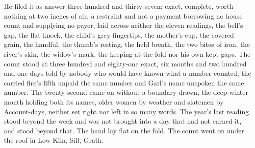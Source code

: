 He filed it as answer three hundred and thirty-seven: exact, complete, worth nothing at two inches of air, a restraint and not a payment borrowing no house count and supplying no payer, laid across neither the eleven readings, the bell's gap, the flat knock, the child's grey fingertips, the mother's cup, the covered grain, the handful, the thumb's resting, the held breath, the two bites of iron, the river's skin, the widow's mark, the keeping at the fold nor his own kept gaps. The count stood at three hundred and eighty-one exact, six months and two hundred and one days told by nobody who would have known what a number counted, the carried fire's fifth unpaid the same number and Garl's name unspoken the same number. The twenty-second came on without a boundary drawn, the deep-winter month holding both its names, older women by weather and slatemen by Account-days, neither set right nor left in so many words. The year's last reading stood beyond the week and was not brought into a day that had not earned it, and  stood beyond that. The hand lay flat on the fold. The count went on under the roof in Low Kiln, Sill, Grath.
